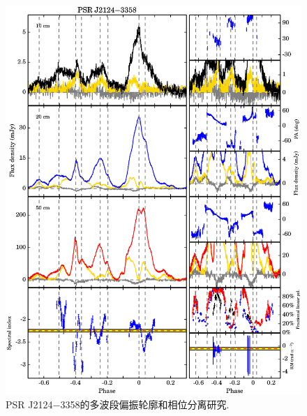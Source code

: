 \begin{figure}
\begin{center}
\includegraphics[width=6 in]{2124.ps}
\caption{PSR J2124$-$3358的多波段偏振轮廓和相位分离研究.}
\label{2124}
\end{center}
\end{figure}

